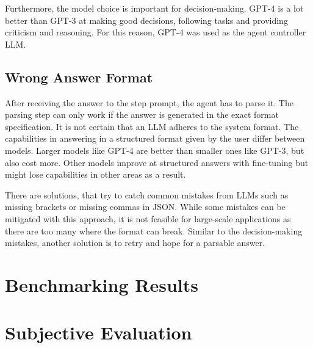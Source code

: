 \documentclass[../main.tex]{subfiles}
\begin{document}
Furthermore, the model choice is important for decision-making.
GPT-4 is a lot better than GPT-3 at making good decisions, following tasks and providing
criticism and reasoning.
For this reason, GPT-4 was used as the agent controller LLM.

\subsection{Wrong Answer Format}

After receiving the answer to the step prompt, the agent has to parse it.
The parsing step can only work if the answer is generated in the exact format specification.
It is not certain that an LLM adheres to the system format.
The capabilities in answering in a structured format given by the user differ between models.
Larger models like GPT-4 are better than smaller ones like GPT-3, but also cost more.
Other models improve at structured answers with fine-tuning
but might lose capabilities in other areas as a result.

There are solutions, that try to catch common mistakes from LLMs
such as missing brackets or missing commas in JSON.
While some mistakes can be mitigated with this approach, it is not feasible
for large-scale applications as there are too many where the format can break.
Similar to the decision-making mistakes, another solution is to retry
and hope for a parsable answer.

\section{Benchmarking Results}

\section{Subjective Evaluation}
\end{document}
